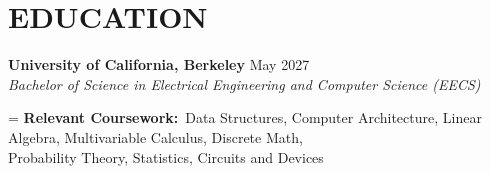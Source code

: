 \section*{EDUCATION}
\noindent
\textbf{University of California, Berkeley} \hfill May 2027 \\
\textit{Bachelor of Science in Electrical Engineering and Computer Science (EECS)}

\noindent
\begingroup
{}%
\hangindent=
\textbf{Relevant Coursework:}\ \nohyphens{Data Structures, Computer Architecture, Linear Algebra, Multivariable Calculus, Discrete Math, \\ Probability Theory, Statistics, Circuits and Devices}
\par
\endgroup
